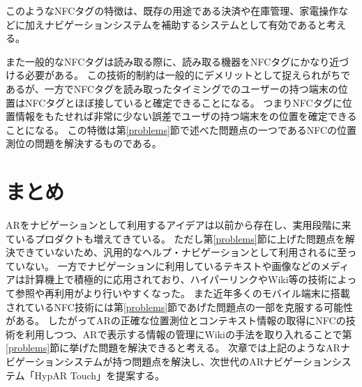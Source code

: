 このようなNFCタグの特徴は、既存の用途である決済や在庫管理、家電操作などに加えナビゲーションシステムを補助するシステムとして有効であると考える。

また一般的なNFCタグは読み取る際に、読み取る機器をNFCタグにかなり近づける必要がある。
この技術的制約は一般的にデメリットとして捉えられがちであるが、一方でNFCタグを読み取ったタイミングでのユーザーの持つ端末の位置はNFCタグとほぼ接していると確定できることになる。
つまりNFCタグに位置情報をもたせれば非常に少ない誤差でユーザの持つ端末をの位置を確定できることになる。
この特徴は第\ref{problems}節で述べた問題点の一つであるNFCの位置測位の問題を解決するものである。


\section{まとめ}
ARをナビゲーションとして利用するアイデアは以前から存在し、実用段階に来ているプロダクトも増えてきている。
ただし第\ref{problems}節に上げた問題点を解決できていないため、汎用的なヘルプ・ナビゲーションとして利用されるに至っていない。
一方でナビゲーションに利用しているテキストや画像などのメディアは計算機上で積極的に応用されており、ハイパーリンクやWiki等の技術によって参照や再利用がより行いやすくなった。
また近年多くのモバイル端末に搭載されているNFC技術には第\ref{problems}節であげた問題点の一部を克服する可能性がある。
したがってARの正確な位置測位とコンテキスト情報の取得にNFCの技術を利用しつつ、ARで表示する情報の管理にWikiの手法を取り入れることで第\ref{problems}節に挙げた問題を解決できると考える。
次章では上記のようなARナビゲーションシステムが持つ問題点を解決し、次世代のARナビゲーションシステム「HypAR Touch」を提案する。